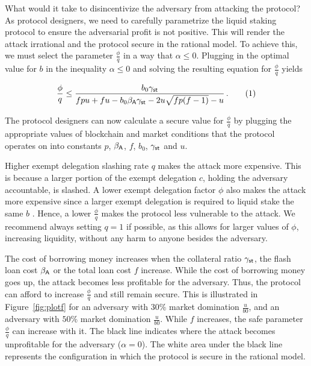 What would it take to disincentivize the adversary from attacking the protocol?
As protocol designers, we need to carefully parametrize the liquid staking protocol
to ensure the adversarial profit is not positive. This will render the attack irrational
and the protocol secure in the rational model. To achieve this, we must select
the parameter $\frac{\phi}{q}$ in a way that $\alpha \leq 0$.
Plugging in the optimal value for $b$ in the inequality $\alpha \leq 0$ and solving
the resulting equation for $\frac{\phi}{q}$ yields

\begin{gather*}
  \frac{\phi}{q} \leq \frac{b_0 \gamma_{\textsf{st}}}{f p u + f u - b_0 \beta_{\textsf{A}} \gamma_{\textsf{st}} - 2 u \sqrt{fp (f-1)} - u}\,. \label{eq:phi-choice} \tag{$1$}
\end{gather*}

The protocol designers can now calculate a secure value for $\frac{\phi}{q}$
by plugging
the appropriate values of blockchain and market conditions
that the protocol operates on into
constants $p$, $\beta_{\textsf{A}}$, $f$, $b_0$, $\gamma_{\textsf{st}}$ and $u$.

Higher exempt delegation slashing rate $q$ makes the attack more expensive. This
is because a larger portion of the exempt delegation $c$, holding the adversary accountable,
is slashed. A lower exempt delegation factor $\phi$ also makes the attack more expensive
since a larger exempt delegation is required to liquid stake the same $b$ \asset.
Hence, a lower $\frac{\phi}{q}$ makes the protocol less vulnerable to the attack.
We recommend always setting $q = 1$ if possible, as this allows for
larger values of $\phi$, increasing liquidity, without any harm to anyone
besides the adversary.

The cost of borrowing money increases when the collateral ratio
$\gamma_{\textsf{st}}$, the flash loan cost $\beta_{\textsf{A}}$ or the total loan cost $f$
increase. While the cost of borrowing money goes up, the attack becomes less profitable
for the adversary. Thus, the protocol can afford to increase $\frac{\phi}{q}$
and still remain secure. This is illustrated in
Figure~\ref{fig:plotf} for an adversary with $30\%$ market domination $\frac{u}{b0}$,
and an adversary with $50\%$ market domination $\frac{u}{b0}$.
While $f$ increases, the safe parameter $\frac{\phi}{q}$ can increase with it.
The black line indicates where the attack becomes unprofitable for the adversary ($\alpha = 0$).
The white area under the black line represents the configuration in which
the protocol is secure in the rational model.


